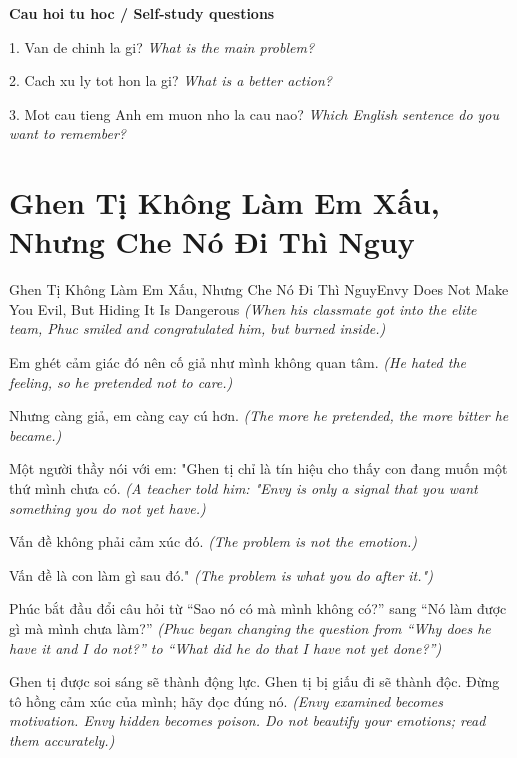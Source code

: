 \begin{tuhocnhanh}
\textbf{Cau hoi tu hoc / Self-study questions}

1. Van de chinh la gi? \textit{What is the main problem?}

2. Cach xu ly tot hon la gi? \textit{What is a better action?}

3. Mot cau tieng Anh em muon nho la cau nao? \textit{Which English sentence do you want to remember?}
\end{tuhocnhanh}
\ngancach

\section{Ghen Tị Không Làm Em Xấu, Nhưng Che Nó Đi Thì Nguy}
\begin{truyen}{Ghen Tị Không Làm Em Xấu, Nhưng Che Nó Đi Thì Nguy}{Envy Does Not Make You Evil, But Hiding It Is Dangerous}
\textit{(When his classmate got into the elite team, Phuc smiled and congratulated him, but burned inside.)}

Em ghét cảm giác đó nên cố giả như mình không quan tâm.
\textit{(He hated the feeling, so he pretended not to care.)}

Nhưng càng giả, em càng cay cú hơn.
\textit{(The more he pretended, the more bitter he became.)}

Một người thầy nói với em: "Ghen tị chỉ là tín hiệu cho thấy con đang muốn một thứ mình chưa có.
\textit{(A teacher told him: "Envy is only a signal that you want something you do not yet have.)}

Vấn đề không phải cảm xúc đó.
\textit{(The problem is not the emotion.)}

Vấn đề là con làm gì sau đó."
\textit{(The problem is what you do after it.")}

Phúc bắt đầu đổi câu hỏi từ ``Sao nó có mà mình không có?'' sang ``Nó làm được gì mà mình chưa làm?''
\textit{(Phuc began changing the question from ``Why does he have it and I do not?'' to ``What did he do that I have not yet done?'')}

\end{truyen}

\begin{baihoc}
Ghen tị được soi sáng sẽ thành động lực. Ghen tị bị giấu đi sẽ thành độc. Đừng tô hồng cảm xúc của mình; hãy đọc đúng nó.
\textit{(Envy examined becomes motivation. Envy hidden becomes poison. Do not beautify your emotions; read them accurately.)}
\end{baihoc}

